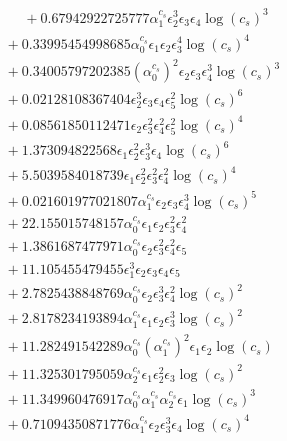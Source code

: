 \documentclass[10pt]{article}
\begin{document}
\begin{align*}
\phantom{F_{s,7}} &\phantom{={}}{}  + 0.67942922725777 \alpha_{1}^{c_s} \epsilon_{2}^{3} \epsilon_{3} \epsilon_{4} \log{\left(c_{s} \right)}^{3} \\
&{}  + 0.33995454998685 \alpha_{0}^{c_s} \epsilon_{1} \epsilon_{2} \epsilon_{3}^{4} \log{\left(c_{s} \right)}^{4} \\
&{}  + 0.34005797202385 \left(\alpha_{0}^{c_s}\right)^{2} \epsilon_{2} \epsilon_{3} \epsilon_{4}^{3} \log{\left(c_{s} \right)}^{3} \\
&{}  + 0.02128108367404 \epsilon_{2}^{3} \epsilon_{3} \epsilon_{4} \epsilon_{5}^{2} \log{\left(c_{s} \right)}^{6} \\
&{}  + 0.08561850112471 \epsilon_{2} \epsilon_{3}^{2} \epsilon_{4}^{2} \epsilon_{5}^{2} \log{\left(c_{s} \right)}^{4} \\
&{}  + 1.373094822568 \epsilon_{1} \epsilon_{2}^{2} \epsilon_{3}^{3} \epsilon_{4} \log{\left(c_{s} \right)}^{6} \\
&{}  + 5.5039584018739 \epsilon_{1} \epsilon_{2}^{2} \epsilon_{3}^{2} \epsilon_{4}^{2} \log{\left(c_{s} \right)}^{4} \\
&{}  + 0.021601977021807 \alpha_{1}^{c_s} \epsilon_{2} \epsilon_{3} \epsilon_{4}^{3} \log{\left(c_{s} \right)}^{5} \\
&{}  + 22.155015748157 \alpha_{0}^{c_s} \epsilon_{1} \epsilon_{2} \epsilon_{3}^{2} \epsilon_{4}^{2} \\
&{}  + 1.3861687477971 \alpha_{0}^{c_s} \epsilon_{2} \epsilon_{3}^{2} \epsilon_{4}^{2} \epsilon_{5} \\
&{}  + 11.105455479455 \epsilon_{1}^{3} \epsilon_{2} \epsilon_{3} \epsilon_{4} \epsilon_{5} \\
&{}  + 2.7825438848769 \alpha_{0}^{c_s} \epsilon_{2} \epsilon_{3}^{3} \epsilon_{4}^{2} \log{\left(c_{s} \right)}^{2} \\
&{}  + 2.8178234193894 \alpha_{1}^{c_s} \epsilon_{1} \epsilon_{2} \epsilon_{3}^{3} \log{\left(c_{s} \right)}^{2} \\
&{}  + 11.282491542289 \alpha_{0}^{c_s} \left(\alpha_{1}^{c_s}\right)^{2} \epsilon_{1} \epsilon_{2} \log{\left(c_{s} \right)} \\
&{}  + 11.325301795059 \alpha_{2}^{c_s} \epsilon_{1} \epsilon_{2}^{2} \epsilon_{3} \log{\left(c_{s} \right)}^{2} \\
&{}  + 11.349960476917 \alpha_{0}^{c_s} \alpha_{1}^{c_s} \alpha_{2}^{c_s} \epsilon_{1} \log{\left(c_{s} \right)}^{3} \\
&{}  + 0.71094350871776 \alpha_{1}^{c_s} \epsilon_{2} \epsilon_{3}^{3} \epsilon_{4} \log{\left(c_{s} \right)}^{4} \\

\end{align*}
\end{document}
